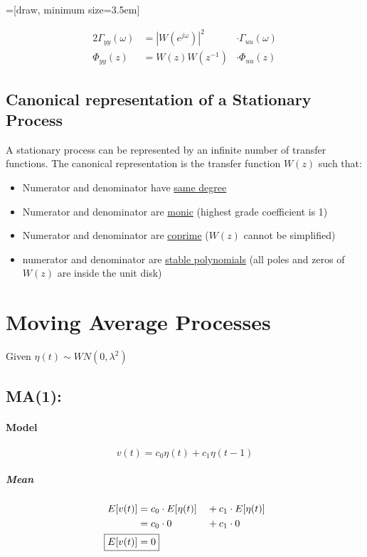 \documentclass{article}
\begin{document}
=[draw, minimum size=3.5em]


\begin{alignat*}{2}
	\Gamma_{yy}(\omega)&=|W(e^{j\omega})|^2 & \cdot \Gamma_{uu}(\omega)\\
	\Phi_{yy}(z)&=W(z)W(z^{-1})				& \cdot \Phi_{uu}(z)
\end{alignat*}

\subsection{Canonical representation of a Stationary Process}
A stationary process can be represented by an infinite number of transfer functions. The canonical representation is the transfer function $W(z)$ such that:
\begin{itemize}
\item Numerator and denominator have \underline{same degree}
\item Numerator and denominator are \underline{monic} (highest grade coefficient is 1)
\item Numerator and denominator are \underline{coprime} ($W(z)$ cannot be simplified)
\item numerator and denominator are \underline{stable polynomials} (all poles and zeros of $W(z)$ are inside the unit disk)
\end{itemize}

\section{Moving Average Processes}
Given $\eta(t) \sim WN(0,\lambda^2)$
\subsection{MA(1): }
\paragraph{Model}
\[v(t)=c_0\eta(t)+c_1\eta(t-1)\]


\subparagraph{Mean}
\begin{alignat*}{2}
	E[v(t)]		&=	c_0\cdot E[\eta(t)]	&	&+	c_1\cdot E[\eta(t)]	\\
				&=	c_0\cdot 0			&	&+	c_1\cdot 0			\\
	\Aboxed{E[v(t)]&=0}
\end{alignat*}\\
\end{document}
